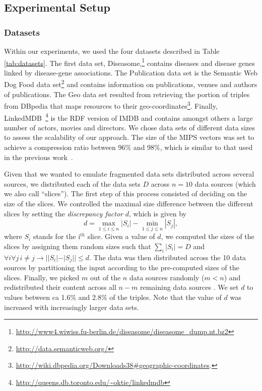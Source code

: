 \documentclass{sig-alternate}  %
\begin{document}
\subsection{Experimental Setup}

\subsubsection{Datasets}
Within our experiments, we used the four datasets described in Table \ref{tab:datasets}.
The first data set, Diseasome,\footnote{\url{http://www4.wiwiss.fu-berlin.de/diseasome/diseasome_dump.nt.bz2}} contains diseases and disease genes linked by disease-gene associations.
The Publication data set is the Semantic Web Dog Food data set\footnote{\url{http://data.semanticweb.org/}} and contains information on publications, venues and authors of publications.
The Geo data set resulted from retrieving the portion of triples from DBpedia that maps resources to their geo-coordinates\footnote{\url{http://wiki.dbpedia.org/Downloads38\#geographic-coordinates}.}.
Finally, LinkedMDB~\footnote{\url{http://queens.db.toronto.edu/~oktie/linkedmdb}} is the RDF version of IMDB and contains amongst others a large number of actors, movies and directors.
We chose data sets of different data sizes to assess the scalability of our approach.
The size of the MIPS vectors was set to achieve a compression ratio between 96\% and 98\%, which is similar to that used in the previous work~\cite{key-5}.

Given that we wanted to emulate fragmented data sets distributed across several sources, we distributed each of the data sets $D$ across $n=10$ data sources (which we also call ``slices'').
The first step of this process consisted of deciding on the size of the slices.
We controlled the maximal size difference between the different slices by setting the \emph{discrepancy factor} $d$, which is given by
\begin{equation}
d = \max\limits_{1 \leq i \leq n} |S_i| - \min\limits_{1 \leq j \leq n} |S_j|,
\end{equation}
where $S_i$ stands for the i$^{th}$ slice. 
Given a value of $d$, we computed the sizes of the slices by assigning them random sizes such that $\sum\limits_{i} |S_i| = D$ and $\forall i \forall j\,i \neq j \rightarrow ||S_i| - |S_j|| \leq d$.
The data was then distributed across the 10 data sources by partitioning the input according to the pre-computed sizes of the slices.
Finally, we picked $m$ out of the $n$ data sources randomly ($m < n$) and redistributed their content across all $n-m$ remaining data sources .
We set $d$ to values between ca 1.6\% and 2.8\% of the triples.
Note that the value of $d$ was increased with increasingly larger data sets.
\end{document}

